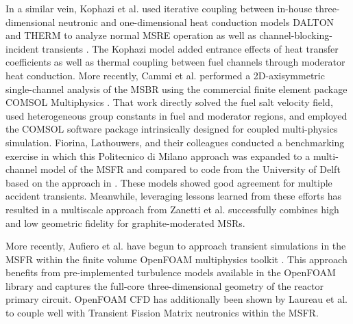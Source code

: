 \documentclass[answers,11pt]{exam}
\begin{document}
\begin{questions}
\begin{solution}
        In a similar vein, Kophazi et al. used iterative coupling between
        in-house
        three-dimensional neutronic and one-dimensional heat conduction models
        DALTON
        and THERM to analyze normal MSRE operation as well as
        channel-blocking-incident transients \cite{kophazi_development_2009}.
        The
        Kophazi model added entrance effects of heat transfer coefficients as
        well as
        thermal coupling between fuel channels through moderator heat
        conduction. More
        recently, Cammi et al. performed a 2D-axisymmetric single-channel
        analysis of
        the MSBR using the commercial finite element package COMSOL
        Multiphysics
        \cite{cammi_multi-physics_2011}. That work directly solved the fuel
        salt
        velocity field, used heterogeneous group constants in fuel and
        moderator
        regions, and employed the COMSOL software package intrinsically
        designed
        for coupled multi-physics simulation.  Fiorina, Lathouwers, and their
        colleagues conducted a benchmarking exercise
        \cite{fiorina_modelling_2013} in
        which this Politecnico di Milano approach was expanded to a
        multi-channel model
        of the MSFR and compared to code from the University of Delft
        \cite{de_zwaan_static_2007,van_der_linden_2012} based on the approach
        in
        \cite{kophazi_development_2009}. These models showed good agreement for
        multiple accident transients. Meanwhile, leveraging lessons learned
        from these
        efforts has resulted in a multiscale approach from Zanetti et al.
        \cite{zanetti_geometric_2015} successfully combines high and low
        geometric
        fidelity for graphite-moderated MSRs.

        More recently, Aufiero et al. \cite{aufiero_development_2014} have
        begun to
        approach transient simulations in the MSFR within the finite
        volume
        OpenFOAM multiphysics toolkit \cite{weller_tensorial_1998}.  This
        approach
        benefits from pre-implemented turbulence models available in the
        OpenFOAM
        library and captures the full-core three-dimensional geometry of the
        reactor
        primary circuit.  OpenFOAM CFD has additionally been shown by
        Laureau et
        al. \cite{laureau_transient_2017} to couple well with Transient Fission
        Matrix
        neutronics within the MSFR.
\end{solution}


\end{questions}
\end{document}
